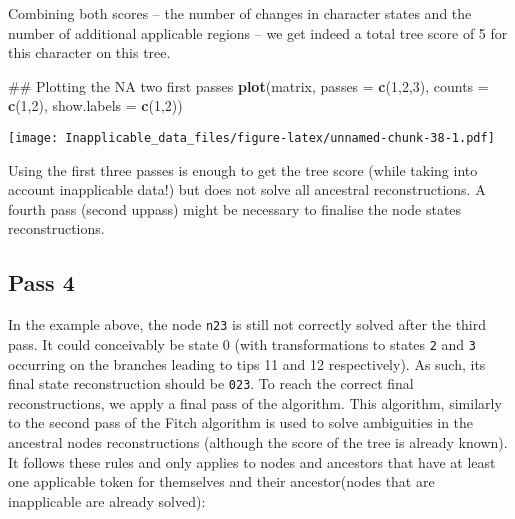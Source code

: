 \documentclass[]{book}
\newenvironment{Shaded}{\begin{snugshade}}{\end{snugshade}}
\newcommand{\KeywordTok}[1]{\textcolor[rgb]{0.13,0.29,0.53}{\textbf{#1}}}
\newcommand{\DataTypeTok}[1]{\textcolor[rgb]{0.13,0.29,0.53}{#1}}
\newcommand{\DecValTok}[1]{\textcolor[rgb]{0.00,0.00,0.81}{#1}}
\newcommand{\NormalTok}[1]{#1}
\theoremstyle{definition}
\theoremstyle{definition}
\theoremstyle{definition}
\theoremstyle{remark}
\begin{document}
Combining both scores -- the number of changes in character states and
the number of additional applicable regions -- we get indeed a total
tree score of 5 for this character on this tree.

\begin{Shaded}
\begin{Highlighting}[]
\NormalTok{## Plotting the NA two first passes}
\KeywordTok{plot}\NormalTok{(matrix, }\DataTypeTok{passes =} \KeywordTok{c}\NormalTok{(}\DecValTok{1}\NormalTok{,}\DecValTok{2}\NormalTok{,}\DecValTok{3}\NormalTok{), }\DataTypeTok{counts =} \KeywordTok{c}\NormalTok{(}\DecValTok{1}\NormalTok{,}\DecValTok{2}\NormalTok{), }\DataTypeTok{show.labels =} \KeywordTok{c}\NormalTok{(}\DecValTok{1}\NormalTok{,}\DecValTok{2}\NormalTok{))}
\end{Highlighting}
\end{Shaded}

\texttt{[image: Inapplicable\_data\_files/figure-latex/unnamed-chunk-38-1.pdf]}

Using the first three passes is enough to get the tree score (while
taking into account inapplicable data!) but does not solve all ancestral
reconstructions. A fourth pass (second uppass) might be necessary to
finalise the node states reconstructions.

\hypertarget{pass-4}{%
\subsection{Pass 4}\label{pass-4}}

In the example above, the node \texttt{n23} is still not correctly
solved after the third pass. It could conceivably be state 0 (with
transformations to states \texttt{2} and \texttt{3} occurring on the
branches leading to tips 11 and 12 respectively). As such, its final
state reconstruction should be \texttt{023}. To reach the correct final
reconstructions, we apply a final pass of the algorithm. This algorithm,
similarly to the second pass of the Fitch algorithm is used to solve
ambiguities in the ancestral nodes reconstructions (although the score
of the tree is already known). It follows these rules and only applies
to nodes and ancestors that have at least one applicable token for
themselves and their ancestor(nodes that are inapplicable are already
solved):
\end{document}
